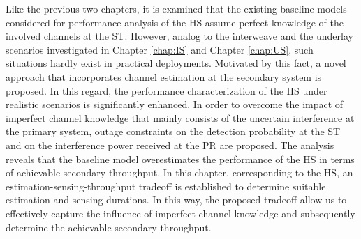 Like the previous two chapters, it is examined that the existing baseline models considered for performance analysis of the HS assume perfect knowledge of the involved channels at the ST. However, analog to the interweave and the underlay scenarios investigated in Chapter \ref{chap:IS} and Chapter \ref{chap:US}, such situations hardly exist in practical deployments. Motivated by this fact, a novel approach that incorporates channel estimation at the secondary system is proposed. In this regard, the performance characterization of the HS under realistic scenarios is significantly enhanced. In order to overcome the impact of imperfect channel knowledge that mainly consists of the uncertain interference at the primary system, outage constraints on the detection probability at the ST and on the interference power received at the PR are proposed. The analysis reveals that the baseline model overestimates the performance of the HS in terms of achievable secondary throughput. In this chapter, corresponding to the HS, an estimation-sensing-throughput tradeoff is established to determine suitable estimation and sensing durations. In this way, the proposed tradeoff allow us to effectively capture the influence of imperfect channel knowledge and subsequently determine the achievable secondary throughput. 

